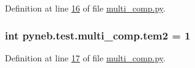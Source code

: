 Definition at line \hyperlink{multi__comp_8py_source_l00016}{16} of file \hyperlink{multi__comp_8py_source}{multi\+\_\+comp.\+py}.

\hypertarget{namespacepyneb_1_1test_1_1multi__comp_ae01807adbb34e2f438764f04a898750f}{}
\subsubsection[{tem2}]{\setlength{\rightskip}{0pt plus 5cm}int pyneb.\+test.\+multi\+\_\+comp.\+tem2 = 1}\label{namespacepyneb_1_1test_1_1multi__comp_ae01807adbb34e2f438764f04a898750f}


Definition at line \hyperlink{multi__comp_8py_source_l00017}{17} of file \hyperlink{multi__comp_8py_source}{multi\+\_\+comp.\+py}.

